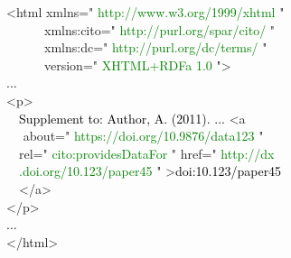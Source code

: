 \raggedright\small\bgroup\ttfamily\frenchspacing
<html \textcolor{dccblue}{xmlns="}%
\textcolor{Green}{http://www.w3.org/1999/xhtml}%
\textcolor{dccblue}{"\\~~~~~~xmlns:cito="}%
\textcolor{Green}{http://purl.org/spar/cito/}%
\textcolor{dccblue}{"\\~~~~~~xmlns:dc="}%
\textcolor{Green}{http://purl.org/dc/terms/}%
\textcolor{dccblue}{"\\~~~~~~version="}%
\textcolor{Green}{XHTML+RDFa 1.0}%
\textcolor{dccblue}{"}>\\
\textcolor{black}{...}\\
<p>\\~~\textcolor{black}{Supplement to: Author, A. (2011). ... }<a\\~~%
\textcolor{dccblue}{about="}%
\textcolor{Green}{https://doi.org/10.9876/data123}%
\textcolor{dccblue}{"\\~~rel="}%
\textcolor{Green}{cito:providesDataFor}%
\textcolor{dccblue}{" href="}%
\textcolor{Green}{http://dx\\~~.doi.org/10.123/paper45}%
\textcolor{dccblue}{"}%
>\textcolor{black}{doi:10.123/paper45}\\~~</a>\\</p>\\
\textcolor{black}{...}\\
</html>\egroup
